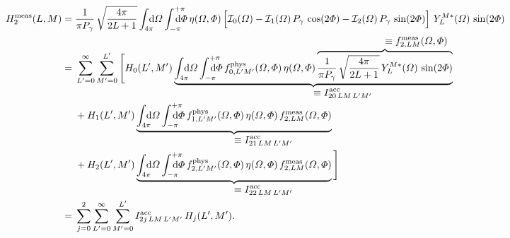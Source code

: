 \begin{align}
  H_2^\text{meas}(L, M)
  ={}& \frac{1}{\pi P_\gamma}\, \sqrt{\frac{4 \pi}{2 L + 1}} \int_{4 \pi}\!\!\!\! \dif{\Omega} \int_{-\pi}^{+\pi}\hspace{-1.2em} \dif{\Phi}\,
  \eta(\Omega, \Phi) \sBrk[2]{\intensity_0(\Omega)
  - \intensity_1(\Omega)\, P_\gamma\, \cos(2 \Phi)
  - \intensity_2(\Omega)\, P_\gamma\, \sin(2 \Phi)}\,
  Y_L^{M *}(\Omega)\, \sin(2 \Phi) \nonumber
  \\
  ={}& \sum_{L' = 0}^\infty \sum_{M' = 0}^{L'} \Bigg[
  H_0(L', M')\,
  \rdUnderbrace{\int_{4 \pi}\!\!\!\! \dif{\Omega} \int_{-\pi}^{+\pi}\hspace{-1.2em} \dif{\Phi}\,
  f_{0, L' M'}^\text{phys}(\Omega, \Phi)\,
  \eta(\Omega, \Phi)\,
  \rdOverbrace{\frac{1}{\pi P_\gamma}\, \sqrt{\frac{4 \pi}{2 L + 1}}\, Y_L^{M *}(\Omega)\, \sin(2 \Phi)}{\equiv f_{2, L M}^\text{meas}(\Omega, \Phi)}}%
  {\equiv I^\text{acc}_{2 0\, L M\, L' M'}} \nonumber
  \\
  & + H_1(L', M')\,
  \rdUnderbrace{\int_{4 \pi}\!\!\!\! \dif{\Omega} \int_{-\pi}^{+\pi}\hspace{-1.2em} \dif{\Phi}\,
  f_{1, L' M'}^\text{phys}(\Omega, \Phi)\,
  \eta(\Omega, \Phi)\,
  f_{2, L M}^\text{meas}(\Omega, \Phi)}%
  {\equiv I^\text{acc}_{2 1\, L M\, L' M'}} \nonumber
  \\
  & + H_2(L', M')\,
  \rdUnderbrace{\int_{4 \pi}\!\!\!\! \dif{\Omega} \int_{-\pi}^{+\pi}\hspace{-1.2em} \dif{\Phi}\,
  f_{2, L' M'}^\text{phys}(\Omega, \Phi)\,
  \eta(\Omega, \Phi)\,
  f_{2, L M}^\text{meas}(\Omega, \Phi)}%
  {\equiv I^\text{acc}_{2 2\, L M\, L' M'}}\, \Bigg] \nonumber
  \\
  \label{eq:photoprod_moment_2_meas2}
  ={}& \sum_{j = 0}^2 \sum_{L' = 0}^\infty \sum_{M' = 0}^{L'}
  I^\text{acc}_{2 j\, L M\, L' M'}\, H_j(L', M').
\end{align}

